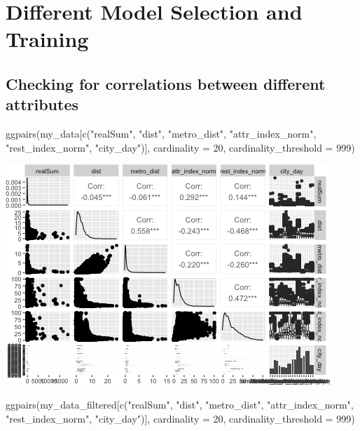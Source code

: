 \documentclass[
]{article}
\newenvironment{Shaded}{\begin{snugshade}}{\end{snugshade}}
\newcommand{\AttributeTok}[1]{\textcolor[rgb]{0.77,0.63,0.00}{#1}}
\newcommand{\DecValTok}[1]{\textcolor[rgb]{0.00,0.00,0.81}{#1}}
\newcommand{\FunctionTok}[1]{\textcolor[rgb]{0.00,0.00,0.00}{#1}}
\newcommand{\NormalTok}[1]{#1}
\newcommand{\StringTok}[1]{\textcolor[rgb]{0.31,0.60,0.02}{#1}}
\begin{document}
\hypertarget{different-model-selection-and-training}{%
\section{Different Model Selection and
Training}\label{different-model-selection-and-training}}

\hypertarget{checking-for-correlations-between-different-attributes}{%
\subsection{Checking for correlations between different
attributes}\label{checking-for-correlations-between-different-attributes}}

\begin{Shaded}
\begin{Highlighting}[]
\FunctionTok{ggpairs}\NormalTok{(my\_data[}\FunctionTok{c}\NormalTok{(}\StringTok{"realSum"}\NormalTok{, }\StringTok{"dist"}\NormalTok{, }\StringTok{"metro\_dist"}\NormalTok{, }\StringTok{"attr\_index\_norm"}\NormalTok{,}
    \StringTok{"rest\_index\_norm"}\NormalTok{, }\StringTok{"city\_day"}\NormalTok{)], }\AttributeTok{cardinality =} \DecValTok{20}\NormalTok{, }\AttributeTok{cardinality\_threshold =} \DecValTok{999}\NormalTok{)}
\end{Highlighting}
\end{Shaded}

\includegraphics{Project_files/figure-latex/unnamed-chunk-33-1.png}

\begin{Shaded}
\begin{Highlighting}[]
\FunctionTok{ggpairs}\NormalTok{(my\_data\_filtered[}\FunctionTok{c}\NormalTok{(}\StringTok{"realSum"}\NormalTok{, }\StringTok{"dist"}\NormalTok{, }\StringTok{"metro\_dist"}\NormalTok{, }\StringTok{"attr\_index\_norm"}\NormalTok{,}
    \StringTok{"rest\_index\_norm"}\NormalTok{, }\StringTok{"city\_day"}\NormalTok{)], }\AttributeTok{cardinality =} \DecValTok{20}\NormalTok{, }\AttributeTok{cardinality\_threshold =} \DecValTok{999}\NormalTok{)}
\end{Highlighting}
\end{Shaded}
\end{document}
